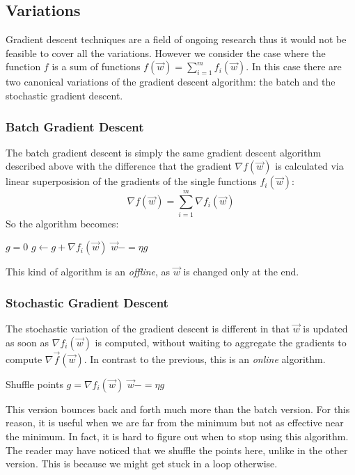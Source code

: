 \subsection{Variations}
Gradient descent techniques are a field of ongoing research thus it would not be feasible to cover all the variations.
However we consider the case where the function \( f \) is a sum of functions \( f(\vec{w}) =
\sum_{i=1}^{m} f_{i}(\vec{w}) \).
In this case there are two canonical variations of the gradient descent algorithm: the batch and the
stochastic gradient descent.

\subsubsection*{Batch Gradient Descent} \label{sec:batch-gradient-descent}
The batch gradient descent is simply the same gradient descent algorithm described above with the difference that
the gradient $\nabla f(\vec{w})$ is calculated via linear superposision of the gradients of the single
functions $f_{i}(\vec{w})$:
\[
  \nabla f(\vec{w}) = \sum_{i=1}^{m} \nabla f_{i}(\vec{w})
\]
So the algorithm becomes:

\begin{algorithmic}[1]
  \State \( g = 0 \)
  \State \( g \gets g + \nabla f_i(\vec{w}) \)
  \EndFor
  \State \( \vec{w} -= \eta g \)
  \EndWhile
\end{algorithmic}

This kind of algorithm is an \textit{offline}, as \( \vec{w}
\) is changed only at the end.

\subsubsection*{Stochastic Gradient Descent} \label{sec:stochastic-gradient-descent}
The stochastic variation of the gradient descent is different in that \( \vec{w} \) is updated as soon as
$\nabla f_{i}(\vec w)$ is computed, without waiting to aggregate the gradients to compute \( \nabla \vec f(\vec w) \).
In contrast to the previous, this is an \textit{online} algorithm.

\begin{algorithmic}[1]
  \State Shuffle points
  \State \( g = \nabla f_i(\vec{w}) \)
  \State \( \vec{w} -= \eta g \)
  \EndFor
  \EndWhile
\end{algorithmic}

This version bounces back and forth much more than the batch version.
For this reason, it is useful when we are far from the minimum but not as effective near the minimum.
In fact, it is hard to figure out when to stop using this algorithm.
The reader may have noticed that we shuffle the points here, unlike in the other version.
This is because we might get stuck in a loop otherwise.

